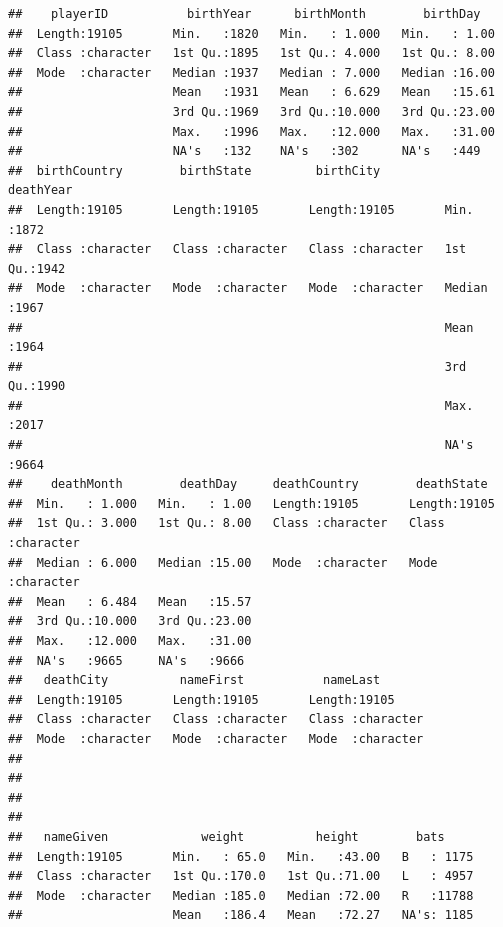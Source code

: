 \documentclass[]{book}
\theoremstyle{definition}
\theoremstyle{definition}
\theoremstyle{definition}
\theoremstyle{remark}
\begin{document}
\begin{verbatim}
##    playerID           birthYear      birthMonth        birthDay    
##  Length:19105       Min.   :1820   Min.   : 1.000   Min.   : 1.00  
##  Class :character   1st Qu.:1895   1st Qu.: 4.000   1st Qu.: 8.00  
##  Mode  :character   Median :1937   Median : 7.000   Median :16.00  
##                     Mean   :1931   Mean   : 6.629   Mean   :15.61  
##                     3rd Qu.:1969   3rd Qu.:10.000   3rd Qu.:23.00  
##                     Max.   :1996   Max.   :12.000   Max.   :31.00  
##                     NA's   :132    NA's   :302      NA's   :449    
##  birthCountry        birthState         birthCity           deathYear   
##  Length:19105       Length:19105       Length:19105       Min.   :1872  
##  Class :character   Class :character   Class :character   1st Qu.:1942  
##  Mode  :character   Mode  :character   Mode  :character   Median :1967  
##                                                           Mean   :1964  
##                                                           3rd Qu.:1990  
##                                                           Max.   :2017  
##                                                           NA's   :9664  
##    deathMonth        deathDay     deathCountry        deathState       
##  Min.   : 1.000   Min.   : 1.00   Length:19105       Length:19105      
##  1st Qu.: 3.000   1st Qu.: 8.00   Class :character   Class :character  
##  Median : 6.000   Median :15.00   Mode  :character   Mode  :character  
##  Mean   : 6.484   Mean   :15.57                                        
##  3rd Qu.:10.000   3rd Qu.:23.00                                        
##  Max.   :12.000   Max.   :31.00                                        
##  NA's   :9665     NA's   :9666                                         
##   deathCity          nameFirst           nameLast        
##  Length:19105       Length:19105       Length:19105      
##  Class :character   Class :character   Class :character  
##  Mode  :character   Mode  :character   Mode  :character  
##                                                          
##                                                          
##                                                          
##                                                          
##   nameGiven             weight          height        bats      
##  Length:19105       Min.   : 65.0   Min.   :43.00   B   : 1175  
##  Class :character   1st Qu.:170.0   1st Qu.:71.00   L   : 4957  
##  Mode  :character   Median :185.0   Median :72.00   R   :11788  
##                     Mean   :186.4   Mean   :72.27   NA's: 1185  

\end{verbatim}
\end{document}
